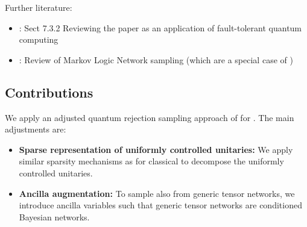 Further literature:
\begin{itemize}
    \item \cite{schuld_machine_2021}: Sect 7.3.2 Reviewing the paper \cite{low_quantum_2014} as an application of fault-tolerant quantum computing
    \item \cite{wittek_quantum_2017}: Review of Markov Logic Network sampling (which are a special case of \ComputationActivationNetworks{})
\end{itemize}


\subsection{Contributions}

We apply an adjusted quantum rejection sampling approach of \cite{low_quantum_2014} for \ComputationActivationNetworks{} \cite{goessmann_tensor_2026}.
The main adjustments are:
\begin{itemize}
    \item {\bf Sparse representation of uniformly controlled unitaries:} We apply similar sparsity mechanisms as for classical \ComputationActivationNetworks{} to decompose the uniformly controlled unitaries.
    \item {\bf Ancilla augmentation:} To sample also from generic tensor networks, we introduce ancilla variables such that generic tensor networks are conditioned Bayesian networks.
\end{itemize}